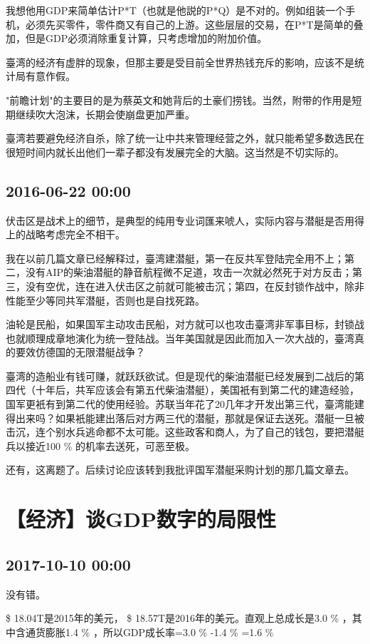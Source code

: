 \documentclass[twocolumn]{ctexart}
\begin{document}
我想他用GDP来简单估计P*T（也就是他説的P*Q）是不对的。例如组装一个手机，必须先买零件，零件商又有自己的上游。这些层层的交易，在P*T是简单的叠加，但是GDP必须消除重复计算，只考虑增加的附加价值。

臺湾的经济有虚胖的现象，但那主要是受目前全世界热钱充斥的影响，应该不是统计局有意作假。

"前瞻计划"的主要目的是为蔡英文和她背后的土豪们捞钱。当然，附带的作用是短期继续吹大泡沫，长期会使崩盘更加严重。

臺湾若要避免经济自杀，除了统一让中共来管理经营之外，就只能希望多数选民在很短时间内就长出他们一辈子都没有发展完全的大脑。这当然是不切实际的。\subsection*{2016-06-22 00:00}
伏击区是战术上的细节，是典型的纯用专业词匯来唬人，实际内容与潜艇是否用得上的战略考虑完全不相干。

我在以前几篇文章已经解释过，臺湾建潜艇，第一在反共军登陆完全用不上；第二，没有AIP的柴油潜艇的静音航程微不足道，攻击一次就必然死于对方反击；第三，没有空优，连在进入伏击区之前就可能被击沉；第四，在反封锁作战中，除非性能至少等同共军潜艇，否则也是自找死路。

油轮是民船，如果国军主动攻击民船，对方就可以也攻击臺湾非军事目标，封锁战也就顺理成章地演化为统一登陆战。当年美国就是因此而加入一次大战的，臺湾真的要效仿德国的无限潜艇战争？

臺湾的造船业有钱可赚，就跃跃欲试。但是现代的柴油潜艇已经发展到二战后的第四代（十年后，共军应该会有第五代柴油潜艇），美国衹有到第二代的建造经验，国军更衹有到第二代的使用经验。苏联当年花了20几年才开发出第三代，臺湾能建得出来吗？如果衹能建出落后对方两三代的潜艇，那就是保证去送死。潜艇一旦被击沉，连个别水兵逃命都不太可能。这些政客和商人，为了自己的钱包，要把潜艇兵以接近100 \% 的机率去送死，可恶至极。

还有，这离题了。后续讨论应该转到我批评国军潜艇采购计划的那几篇文章去。\section*{【经济】谈GDP数字的局限性}
\subsection*{2017-10-10 00:00}
没有错。

 \$ 18.04T是2015年的美元， \$ 18.57T是2016年的美元。直观上总成长是3.0 \% ，其中含通货膨胀1.4 \% ，所以GDP成长率=3.0 \% -1.4 \% =1.6 \% 
\end{document}
